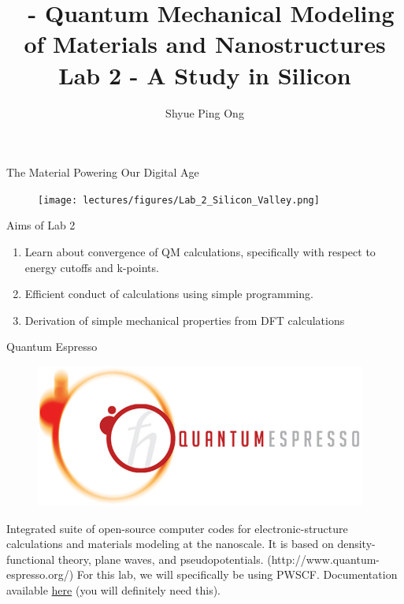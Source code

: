 \documentclass[aspectratio=169]{beamer}
\title[\classname Lab 2 - A Study in Silicon]{\classname~- Quantum Mechanical Modeling of Materials and Nanostructures\\Lab 2 - A Study in Silicon}
\author{Shyue Ping Ong}
\institute[UCSD]{University of California, San Diego\\
\medskip
}
\date{\classyear} %
\begin{document}
    \begin{frame}
        \titlepage %
    \end{frame}


    \begin{frame}{The Material Powering Our Digital Age}
        \begin{figure}
            \centering
            \texttt{[image: lectures/figures/Lab\_2\_Silicon\_Valley.png]}
        \end{figure}

    \end{frame}


    \begin{frame}{Aims of Lab 2}
        \Large{
            \begin{enumerate}
                \item Learn about convergence of QM calculations, specifically with respect to energy cutoffs and k-points.
                \item Efficient conduct of calculations using simple programming.
                \item Derivation of simple mechanical properties from DFT calculations
            \end{enumerate}
        }
    \end{frame}

    \begin{frame}{Quantum Espresso}
        \begin{figure}
            \centering
            \includegraphics[width=0.3\linewidth]{lectures/figures/Lab_2_Quantum_Espresso.png}
        \end{figure}
        Integrated suite of open-source computer codes for electronic-structure calculations and materials modeling at the nanoscale. It is based on density-functional theory, plane waves, and pseudopotentials. (http://www.quantum-espresso.org/)\newline
        \newline
        For this lab, we will specifically be using PWSCF. Documentation available \href{https://www.quantum-espresso.org/Doc/pw_user_guide/}{here}
        (you will definitely need this).
    \end{frame}
\end{document}
